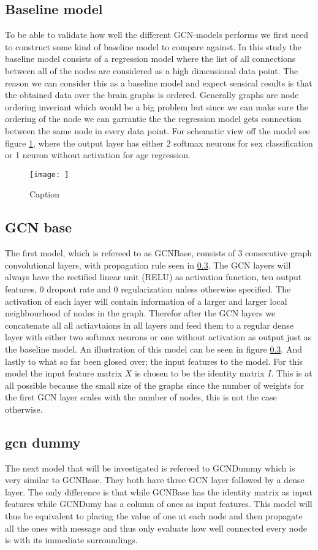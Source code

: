 \subsection{Baseline model}
To be able to validate how well the different GCN-models performs we first need to construct some kind of baseline model to compare against. In this study the baseline model consists of a regression model where the list of all connections between all of the nodes are considered as a high dimensional data point. The reason we can consider this as a baseline model and  expect sensical results is that the obtained data over the brain graphs is ordered. Generally graphs are node ordering inveriant which would be a big problem but since we can make sure the ordering of the node we can garrantie the the regression model gets connection between the same node in every data point. For schematic view off the model see figure \ref{fig:Graph_class_baseline}, where the output layer has either 2 softmax neurons for sex classification or 1 neuron without activation for age regression. 
\begin{figure}
    \centering
    \texttt{[image: ]}
    \caption{Caption}
    \label{fig:Graph_class_baseline}
\end{figure}

\subsection{GCN base}
The first model, which is refereed to as GCNBase, consists of 3 consecutive graph convolutional layers, with propagation rule seen in \ref{}. The GCN layers will always have the rectified linear unit (RELU) as activation function, ten output features, 0 dropout rate and 0 regularization unless otherwise specified. The activation of each layer will contain information of a larger and larger local neighbourhood of nodes in the graph. Therefor after the GCN layers we concatenate all all actiavtaions in all layers and feed them to a regular dense layer with either two softmax neurons or one without activation as output just as the baseline model. An illustration of this model can be seen in figure \ref{}. And lastly to what so far been glosed over; the input features to the model. For this model the input feature matrix $X$ is chosen to be the identity matrix $I$. This is at all possible because the small size of the graphs since the number of weights for the first GCN layer scales with the number of nodes, this is not the case otherwise.

\subsection{gcn dummy}
The next model that will be investigated is refereed to GCNDummy which is very similar to GCNBase. They both have three GCN layer followed by a dense layer. The only difference is that while GCNBase has the identity matrix as input features while GCNDumy has a column of ones as input features. This model will thus be equivalent to placing the value of one at each node and then propagate all the ones with message and thus only evaluate how well connected every node is with its immediate surroundings.  

